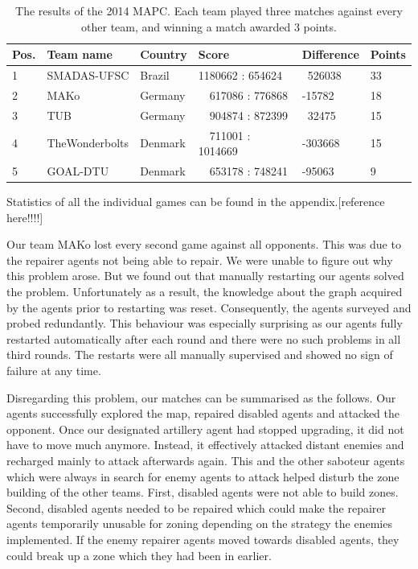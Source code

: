 \begin{table}[ht]
  \centering
  \label{tab:mapc2014results}
  \begin{tabularx}{\textwidth}{| l | X | p{2cm} | X | p{2cm} | l |}
    \hline
    \textbf{Pos.} & \textbf{Team name} & \textbf{Country} & \textbf{Score}       & \textbf{Difference} & \textbf{Points} \\ \hline
    1             & SMADAS-UFSC        & Brazil           & 1180662 : 654624     & \ 526038            & 33              \\
    2             & MAKo               & Germany          & \ \ 617086 : 776868  & -15782              & 18              \\
    3             & TUB                & Germany          & \ \ 904874 : 872399  & \ 32475             & 15              \\
    4             & TheWonderbolts     & Denmark          & \ \ 711001 : 1014669 & -303668             & 15              \\
    5             & GOAL-DTU           & Denmark          & \ \ 653178 : 748241  & -95063              & 9               \\ \hline
  \end{tabularx}
  \caption{The results of the 2014 MAPC. Each team played three matches against every other team, and winning a match awarded 3 points.}
\end{table}
Statistics of all the individual games can be found in the appendix.[reference here!!!!] %

Our team MAKo lost every second game against all opponents.
This was due to the repairer agents not being able to repair.
We were unable to figure out why this problem arose.
But we found out that manually restarting our agents solved the problem.
Unfortunately as a result, the knowledge about the graph acquired by the agents prior to restarting was reset.
Consequently, the agents surveyed and probed redundantly.
This behaviour was especially surprising as our agents fully restarted automatically after each round and there were no such problems in all third rounds.
The restarts were all manually supervised and showed no sign of failure at any time.

Disregarding this problem, our matches can be summarised as the follows.
Our agents successfully explored the map, repaired disabled agents and attacked the opponent.
Once our designated artillery agent had stopped upgrading, it did not have to move much anymore.
Instead, it effectively attacked distant enemies and recharged mainly to attack afterwards again.
This and the other saboteur agents which were always in search for enemy agents to attack helped disturb the zone building of the other teams.
First, disabled agents were not able to build zones.
Second, disabled agents needed to be repaired which could make the repairer agents temporarily unusable for zoning depending on the strategy the enemies implemented.
If the enemy repairer agents moved towards disabled agents, they could break up a zone which they had been in earlier.

